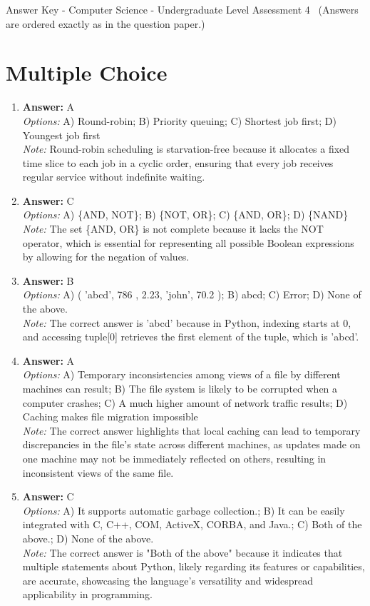 \documentclass[12pt]{article}
\begin{document}
\begin{center}
Answer Key - Computer Science - Undergraduate Level Assessment 4 \
\small (Answers are ordered exactly as in the question paper.)
\end{center}

\section*{Multiple Choice}
\begin{enumerate}[label=\arabic*.]
\item \textbf{Answer:} A
\\ \textit{Options:} A) Round-robin; B) Priority queuing; C) Shortest job first; D) Youngest job first
\\ \textit{Note:} Round-robin scheduling is starvation-free because it allocates a fixed time slice to each job in a cyclic order, ensuring that every job receives regular service without indefinite waiting.
\item \textbf{Answer:} C
\\ \textit{Options:} A) \{AND, NOT\}; B) \{NOT, OR\}; C) \{AND, OR\}; D) \{NAND\}
\\ \textit{Note:} The set \{AND, OR\} is not complete because it lacks the NOT operator, which is essential for representing all possible Boolean expressions by allowing for the negation of values.
\item \textbf{Answer:} B
\\ \textit{Options:} A) ( 'abcd', 786 , 2.23, 'john', 70.2 ); B) abcd; C) Error; D) None of the above.
\\ \textit{Note:} The correct answer is 'abcd' because in Python, indexing starts at 0, and accessing tuple[0] retrieves the first element of the tuple, which is 'abcd'.
\item \textbf{Answer:} A
\\ \textit{Options:} A) Temporary inconsistencies among views of a file by different machines can result; B) The file system is likely to be corrupted when a computer crashes; C) A much higher amount of network traffic results; D) Caching makes file migration impossible
\\ \textit{Note:} The correct answer highlights that local caching can lead to temporary discrepancies in the file's state across different machines, as updates made on one machine may not be immediately reflected on others, resulting in inconsistent views of the same file.
\item \textbf{Answer:} C
\\ \textit{Options:} A) It supports automatic garbage collection.; B) It can be easily integrated with C, C++, COM, ActiveX, CORBA, and Java.; C) Both of the above.; D) None of the above.
\\ \textit{Note:} The correct answer is "Both of the above" because it indicates that multiple statements about Python, likely regarding its features or capabilities, are accurate, showcasing the language's versatility and widespread applicability in programming.
\end{enumerate}
\end{document}
